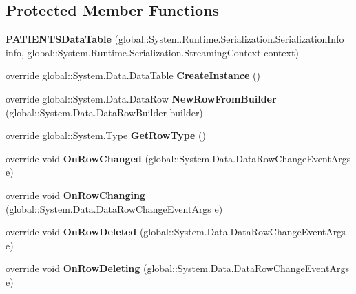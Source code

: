 \subsection*{Protected Member Functions}
\begin{CompactItemize}
\item 
\textbf{PATIENTSDataTable} (global::System.Runtime.Serialization.SerializationInfo info, global::System.Runtime.Serialization.StreamingContext context)\label{class_automatic_medical_system_1_1_data_set2_1_1_p_a_t_i_e_n_t_s_data_table_0383f08f9e57c3f0d488e1c2073abae4}

\item 
override global::System.Data.DataTable \textbf{CreateInstance} ()\label{class_automatic_medical_system_1_1_data_set2_1_1_p_a_t_i_e_n_t_s_data_table_0e2021cc143fb1bb8a98a7c0670bea25}

\item 
override global::System.Data.DataRow \textbf{NewRowFromBuilder} (global::System.Data.DataRowBuilder builder)\label{class_automatic_medical_system_1_1_data_set2_1_1_p_a_t_i_e_n_t_s_data_table_2666125780f692d47a35c926a251ceee}

\item 
override global::System.Type \textbf{GetRowType} ()\label{class_automatic_medical_system_1_1_data_set2_1_1_p_a_t_i_e_n_t_s_data_table_35728cd55088fb5a029093f0d42f925b}

\item 
override void \textbf{OnRowChanged} (global::System.Data.DataRowChangeEventArgs e)\label{class_automatic_medical_system_1_1_data_set2_1_1_p_a_t_i_e_n_t_s_data_table_f1db93d15e20858ee20b7c28eaefdbe1}

\item 
override void \textbf{OnRowChanging} (global::System.Data.DataRowChangeEventArgs e)\label{class_automatic_medical_system_1_1_data_set2_1_1_p_a_t_i_e_n_t_s_data_table_4b9559ad488b55a88947821d9e992bea}

\item 
override void \textbf{OnRowDeleted} (global::System.Data.DataRowChangeEventArgs e)\label{class_automatic_medical_system_1_1_data_set2_1_1_p_a_t_i_e_n_t_s_data_table_633582075dc8db8944631e22db875494}

\item 
override void \textbf{OnRowDeleting} (global::System.Data.DataRowChangeEventArgs e)\label{class_automatic_medical_system_1_1_data_set2_1_1_p_a_t_i_e_n_t_s_data_table_e3086774285b914ecfc7960e16e467e8}

\end{CompactItemize}
